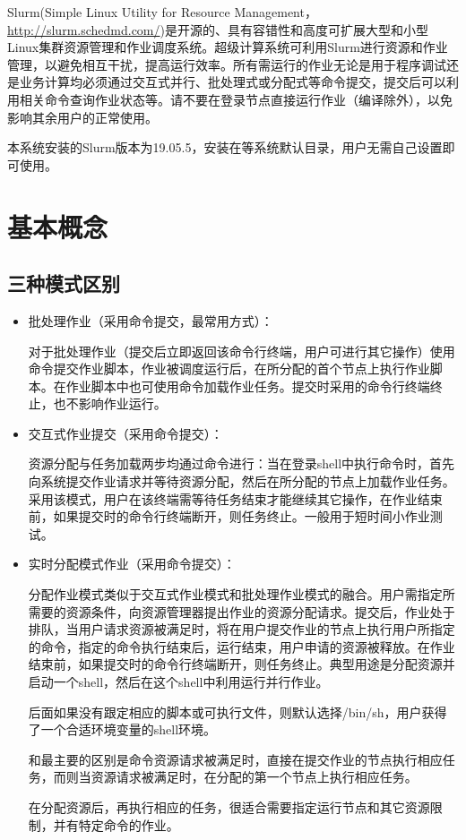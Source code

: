 
Slurm(Simple Linux Utility for Resource Management，\url{http://slurm.schedmd.com/})是开源的、具有容错性和高度可扩展大型和小型Linux集群资源管理和作业调度系统。超级计算系统可利用Slurm进行资源和作业管理，以避免相互干扰，提高运行效率。所有需运行的作业无论是用于程序调试还是业务计算均必须通过交互式并行、批处理式或分配式等命令提交，提交后可以利用相关命令查询作业状态等。请不要在登录节点直接运行作业（编译除外），以免影响其余用户的正常使用。

本系统安装的Slurm版本为19.05.5，安装在等系统默认目录，用户无需自己设置即可使用。
\section{基本概念}

\subsection{三种模式区别}
\begin{itemize}
	\item 批处理作业（采用命令提交，最常用方式）：

对于批处理作业（提交后立即返回该命令行终端，用户可进行其它操作）使用命令提交作业脚本，作业被调度运行后，在所分配的首个节点上执行作业脚本。在作业脚本中也可使用命令加载作业任务。提交时采用的命令行终端终止，也不影响作业运行。
	\item 交互式作业提交（采用命令提交）：

资源分配与任务加载两步均通过命令进行：当在登录shell中执行命令时，首先向系统提交作业请求并等待资源分配，然后在所分配的节点上加载作业任务。采用该模式，用户在该终端需等待任务结束才能继续其它操作，在作业结束前，如果提交时的命令行终端断开，则任务终止。一般用于短时间小作业测试。
	\item 实时分配模式作业（采用命令提交）：

分配作业模式类似于交互式作业模式和批处理作业模式的融合。用户需指定所需要的资源条件，向资源管理器提出作业的资源分配请求。提交后，作业处于排队，当用户请求资源被满足时，将在用户提交作业的节点上执行用户所指定的命令，指定的命令执行结束后，运行结束，用户申请的资源被释放。在作业结束前，如果提交时的命令行终端断开，则任务终止。典型用途是分配资源并启动一个shell，然后在这个shell中利用运行并行作业。

后面如果没有跟定相应的脚本或可执行文件，则默认选择/bin/sh，用户获得了一个合适环境变量的shell环境。

和最主要的区别是命令资源请求被满足时，直接在提交作业的节点执行相应任务，而则当资源请求被满足时，在分配的第一个节点上执行相应任务。

在分配资源后，再执行相应的任务，很适合需要指定运行节点和其它资源限制，并有特定命令的作业。
\end{itemize}


